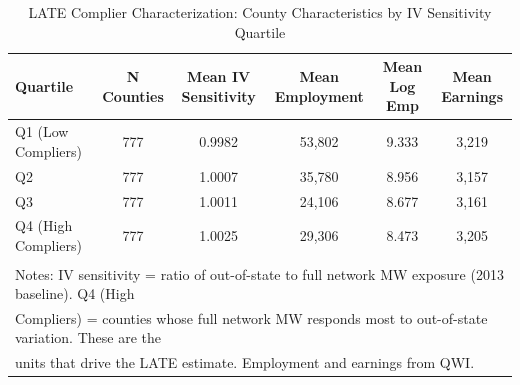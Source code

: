 \begin{table}[!h]
\centering
\caption{\label{tab:compliers}LATE Complier Characterization: County Characteristics by IV Sensitivity Quartile}
\centering
\begin{tabular}[t]{lccccc}
\toprule
Quartile & N Counties & Mean IV Sensitivity & Mean Employment & Mean Log Emp & Mean Earnings\\
\midrule
Q1 (Low Compliers) & 777 & 0.9982 & 53,802 & 9.333 & 3,219\\
Q2 & 777 & 1.0007 & 35,780 & 8.956 & 3,157\\
Q3 & 777 & 1.0011 & 24,106 & 8.677 & 3,161\\
Q4 (High Compliers) & 777 & 1.0025 & 29,306 & 8.473 & 3,205\\
\bottomrule
\multicolumn{6}{l}{\textsuperscript{} Notes: IV sensitivity = ratio of out-of-state to full network MW exposure (2013 baseline). Q4 (High}\\
\multicolumn{6}{l}{Compliers) = counties whose full network MW responds most to out-of-state variation. These are the}\\
\multicolumn{6}{l}{units that drive the LATE estimate. Employment and earnings from QWI.}\\
\end{tabular}
\end{table}
